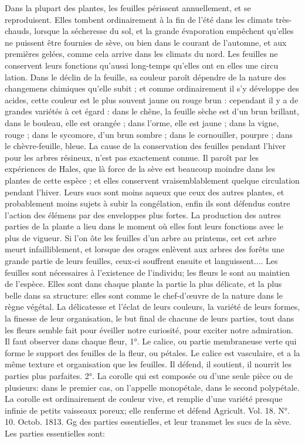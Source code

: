 Dans la plupart des plantes, les feuilles périssent annuellement, et se reproduisent. Elles tombent ordinairement à la fin de l'été dans les climats très-chauds, lorsque la sécheresse du sol, et la grande évaporation empêchent qu'elles ne puissent être fournies de sève, ou bien dans le courant de l'automne, et aux premières gelées, comme cela arrive dans les climats du nord. Les feuilles ne conservent leurs fonctions qu'aussi long-temps qu'elles ont en elles une circu\setcounter{page}{386} lation. Dans le déclin de la feuille, sa couleur paroît dépendre de la nature des changemens chimiques qu'elle subit ; et comme ordinairement il s'y développe des acides, cette couleur est le plus souvent jaune ou rouge brun : cependant il y a de grandes variétés à cet égard : dans le chêne, la feuille sèche est d'un brun brillant, dans le bouleau, elle est orangée ; dans l'orme, elle est jaune ; dans la vigne, rouge ; dans le sycomore, d'un brun sombre ; dans le cornouiller, pourpre ; dans le chèvre-feuille, bleue.
La cause de la conservation des feuilles pendant l'hiver pour les arbres résineux, n'est pas exactement connue. Il paroît par les expériences de Hales, que là force de la sève est beaucoup moindre dans les plantes de cette espèce ; et elles conservent vraisemblablement quelque circulation pendant l'hiver. Leurs sucs sont moins aqueux que ceux des autres plantes, et probablement moins sujets à subir la congélation, enfin ils sont défendus contre l'action des élémens par des enveloppes plus fortes.
La production des autres parties de la plante a lieu dans le moment où elles font leurs fonctions avec le plus de vigueur. Si l'on ôte les feuilles d'un arbre au printems, cet\setcounter{page}{387} cet arbre meurt infailliblement, et lorsque des orages enlèvent aux arbres des forêts une grande partie de leurs feuilles, ceux-ci souffrent ensuite et languissent....
Les feuilles sont nécessaires à l'existence de l'individu; les fleurs le sont au maintien de l'espèce. Elles sont dans chaque plante la partie la plus délicate, et la plus belle dans sa structure: elles sont comme le chef-d'œuvre de la nature dans le règne végétal. La délicatesse et l'éclat de leurs couleurs, la variété de leurs formes, la finesse de leur organisation, le but final de chacune de leurs parties, tout dans les fleurs semble fait pour éveiller notre curiosité, pour exciter notre admiration.
Il faut observer dans chaque fleur, 1°. Le calice, ou partie membraneuse verte qui forme le support des feuilles de la fleur, ou pétales. Le calice est vasculaire, et a la même texture et organisation que les feuilles. Il défend, il soutient, il nourrit les parties plus parfaites. 2°. La corolle qui est composée ou d'une seule pièce ou de plusieurs: dans le premier cas, on l'appelle monopétale, dans le second polypétale. La corolle est ordinairement de couleur vive, et remplie d'une variété presque infinie de petits vaisseaux poreux; elle renferme et défend
Agricult. Vol. 18. N°. 10. Octob. 1813. Gg\setcounter{page}{388} des parties essentielles, et leur transmet les sucs de la sève. Les parties essentielles sont:
